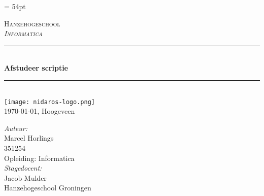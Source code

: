 \documentclass[a4paper,11pt,oneside]{report}
\begin{document}

\pagestyle{fancy}
\renewcommand{\headrulewidth}{0.0pt}
\headheight = 54pt








\begin{titlepage}
\oddsidemargin 1cm

\newcommand{\HRule}{\rule{\linewidth}{0.5mm}} %

\center %

\textsc{\LARGE Hanzehogeschool}\\[1.0cm] %

\textsc{\large \textit{Informatica} }\\[0.5cm] %


\HRule \\[0.4cm]
{ \huge \bfseries Afstudeer scriptie}\\[0.4cm] %
\HRule \\[6cm]



\texttt{[image: nidaros-logo.png]}\\
\today, Hoogeveen
\end{titlepage}

\large
\emph{Auteur:}\\
Marcel Horlings\\
 \textsc{351254} \\
Opleiding: Informatica \\



\emph{Stagedocent:}\\
Jacob Mulder\\
Hanzehogeschool Groningen \\
\end{document}
